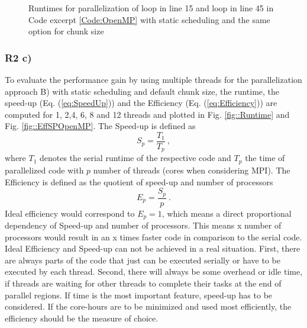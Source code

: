\documentclass[a4paper, 11pt, oneside]{scrartcl}
\newcommand{\refFig}[1]{Fig. \ref{#1}}
\newcommand{\refEq}[1]{Eq. (\ref{#1})}
\newcommand{\refCode}[1]{Code excerpt \ref{#1}}
\begin{document}
\begin{figure}[h!]
	\centering
	\caption{\label{fig::OpenMPStatic} Runtimes for parallelization of loop in line 15 and loop in line 45 in \refCode{Code:OpenMP} with static scheduling and the same option for chunk size }
\end{figure}

\subsubsection{R2 c)}

To evaluate the performance gain by using multiple threads for the parallelization approach B) with static scheduling and default chunk size, the runtime, the speed-up (\refEq{eq:SpeedUp}) and the Efficiency (\refEq{eq:Efficiency}) are computed for 1, 2,4, 6, 8 and 12 threads and plotted in  \refFig{fig::Runtime} and \refFig{fig::EffSPOpenMP}. The Speed-up is defined as 
%
\begin{equation} \label{eq:SpeedUp}
	S_p = \frac{T_1}{T_p} \ ,
\end{equation}
%
where $T_1$ denotes the serial runtime of the respective code and $T_p$ the time of parallelized code with $p$ number of threads (cores when considering MPI). The Efficiency is defined as the quotient of speed-up and number of processors 
%
\begin{equation}\label{eq:Efficiency}
	E_p = \frac{S_p}{p} \ .
\end{equation}
%
Ideal efficiency would correspond to $E_p=1$, which means a direct proportional dependency of Speed-up and number of processors. This means x number of processors would result in an x times faster code in comparison to the serial code. Ideal Efficiency and Speed-up can not be achieved in a real situation. First, there are always parts of the code that just can be executed serially or have to be executed by each thread. Second, there will always be some overhead or idle time, if threads are waiting for other threads to complete their tasks at the end of parallel regions. If time is the most important feature, speed-up has to be considered. If the core-hours are to be minimized and used most efficiently, the efficiency should be the measure of choice.
\end{document}
